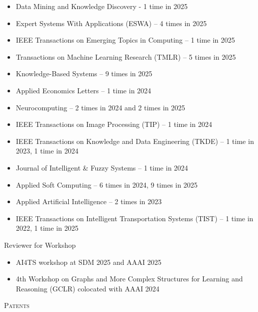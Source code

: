\documentclass[10pt]{article}
\newenvironment{changemargin}[2]{
  \begin{list}{}{
    \setlength{\topsep}{0pt}
    \setlength{\leftmargin}{#1}
    \setlength{\rightmargin}{#2}
    \setlength{\listparindent}{\parindent}
    \setlength{\itemindent}{\parindent}
    \setlength{\parsep}{\parskip}
  }
  \item[]}{\end{list}
}
\newcommand{\lineover}{
	\begin{changemargin}{-0.05in}{-0.05in}
		\vspace*{-8pt}
		\hrulefill \\
		\vspace*{-2pt}
	\end{changemargin}
}
\newcommand{\header}[1]{
	\begin{changemargin}{-0.5in}{-0.5in}
		\scshape{#1}\\
  	\lineover
	\end{changemargin}
}
\newenvironment{body} {
	\vspace*{-16pt}
	\begin{changemargin}{-0.25in}{-0.5in}
  }
	{\end{changemargin}
}
\begin{document}
\begin{body}
\begin{itemize}
        \item Data Mining and Knowledge Discovery - 1 time in 2025
        \item Expert Systems With Applications (ESWA) – 4 times in 2025
        \item IEEE Transactions on Emerging Topics in Computing – 1 time in 2025
        \item Transactions on Machine Learning Research (TMLR) – 5 times in 2025
        \item Knowledge-Based Systems – 9 times in 2025
        \item Applied Economics Letters – 1 time in 2024
        \item Neurocomputing – 2 times in 2024 and 2 times in 2025
        \item IEEE Transactions on Image Processing (TIP) – 1 time in 2024
        \item IEEE Transactions on Knowledge and Data Engineering (TKDE) – 1 time in 2023, 1 time in 2024
        \item Journal of Intelligent \& Fuzzy Systems – 1 time in 2024
        \item Applied Soft Computing – 6 times in 2024, 9 times in 2025
        \item Applied Artificial Intelligence – 2 times in 2023
        \item IEEE Transactions on Intelligent Transportation Systems (TIST) – 1 time in 2022, 1 time in  2025
    \end{itemize}
   Reviewer for Workshop
    \begin{itemize}
        \item AI4TS workshop at SDM 2025 and AAAI 2025
        \item 4th Workshop on Graphs and More Complex Structures for Learning and Reasoning (GCLR) colocated with AAAI 2024
    \end{itemize}
\end{body}

\medskip

\header{Patents}
\end{document}
